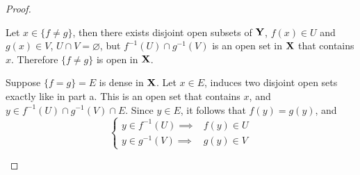 \documentclass[../../main.tex]{subfiles}
\begin{document}
\begin{proof}
    \begin{enumalpha}
        \item[]
        \item Let $x\in \{f\neq g\}$, then there exists disjoint open subsets of ${\mathbf{Y}}$, $f(x)\in U$ and $g(x)\in V$, $U\cap V=\varnothing$, but $f^{-1}(U)\cap g^{-1}(V)$ is an open set in ${\mathbf{X}}$ that contains $x$. Therefore $\{f\neq g\}$ is open in ${\mathbf{X}}$.
        \item Suppose $\{f=g\}=E$ is dense in ${\mathbf{X}}$. Let $x\in E$, induces two disjoint open sets exactly like in part a. This is an open set that contains $x$, and $y\in f^{-1}(U)\cap g^{-1}(V)\cap E$. Since $y\in E$, it follows that $f(y) = g(y)$, and
        \[
            \begin{cases}
            y\in f^{-1}(U)\implies &f(y)\in U\\
            y\in g^{-1}(V)\implies &g(y)\in V
            \end{cases}
        \]
    \end{enumalpha}
\end{proof}
\newpage


\end{document}
